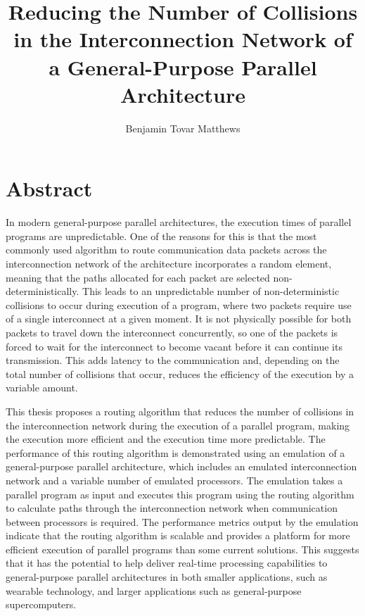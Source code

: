 \documentclass[a4paper, 12pt]{article}
\title{Reducing the Number of Collisions in the Interconnection Network of a General-Purpose Parallel Architecture}
\author{Benjamin Tovar Matthews}
\begin{document}
\setcounter{page}{0}



\newpage
{}
\setcounter{page}{2}
\section*{Abstract}

In modern general-purpose parallel architectures, the execution times of parallel programs are unpredictable. One of the reasons for this is that the most commonly used algorithm to route communication data packets across the interconnection network of the architecture incorporates a random element, meaning that the paths allocated for each packet are selected non-deterministically. This leads to an unpredictable number of non-deterministic collisions to occur during execution of a program, where two packets require use of a single interconnect at a given moment. It is not physically possible for both packets to travel down the interconnect concurrently, so one of the packets is forced to wait for the interconnect to become vacant before it can continue its transmission. This adds latency to the communication and, depending on the total number of collisions that occur, reduces the efficiency of the execution by a variable amount.

This thesis proposes a routing algorithm that reduces the number of collisions in the interconnection network during the execution of a parallel program, making the execution more efficient and the execution time more predictable. The performance of this routing algorithm is demonstrated using an emulation of a general-purpose parallel architecture, which includes an emulated interconnection network and a variable number of emulated processors. The emulation takes a parallel program as input and executes this program using the routing algorithm to calculate paths through the interconnection network when communication between processors is required. The performance metrics output by the emulation indicate that the routing algorithm is scalable and provides a platform for more efficient execution of parallel programs than some current solutions. This suggests that it has the potential to help deliver real-time processing capabilities to general-purpose parallel architectures in both smaller applications, such as wearable technology, and larger applications such as general-purpose supercomputers.

\newpage
\setcounter{tocdepth}{2}
\tableofcontents
\newpage
\listoffigures
\newpage
\listoftables
\end{document}
